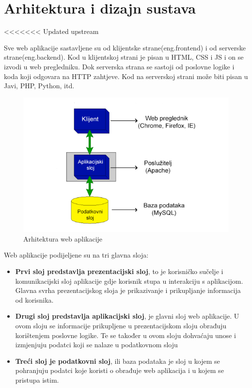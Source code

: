 \chapter{Arhitektura i dizajn sustava}
<<<<<<< Updated upstream

		Sve web aplikacije sastavljene su od klijentske strane(eng.frontend) i od serverske strane(eng.backend). Kod u klijentskoj strani je pisan u HTML, CSS i JS i on se izvodi u web pregledniku. Dok serverska strana se sastoji od poslovne logike i koda koji odgovara na HTTP zahtjeve. Kod na serverskoj strani može biti pisan u Javi, PHP, Python, itd.
		
		

		\begin{figure}[H]
			
			\includegraphics[width=\textwidth]{slike/webAplikacija.png} %
			\centering
			\caption{Arhitektura web aplikacije}
			\label{fig:arhitekturaWebApp}
		\end{figure}
		Web aplikacije podijeljene su na tri glavna sloja:
		
		\begin{itemize}
			\item \textbf{Prvi sloj predstavlja prezentacijski sloj}, to je korisničko sučelje i komunikacijski sloj aplikacije gdje korisnik stupa u interakciju s aplikacijom. Glavna svrha prezentacijskog sloja je prikazivanje i prikupljanje informacija od korisnika.
			\item\textbf{Drugi sloj predstavlja aplikacijski sloj}, je glavni sloj web aplikacije. U ovom sloju se informacije prikupljene u prezentacijskom sloju obrađuju korištenjem poslovne logike. Te se također u ovom sloju dohvaćaju unose i izmjenjuju podatci koji se nalaze u podatkovnom sloju
			\item\textbf{Treći sloj je podatkovni sloj}, ili baza podataka je sloj u kojem se pohranjuju podatci koje koristi o obrađuje web aplikacija i u kojem se pristupa istim.
		\end{itemize} 
	
